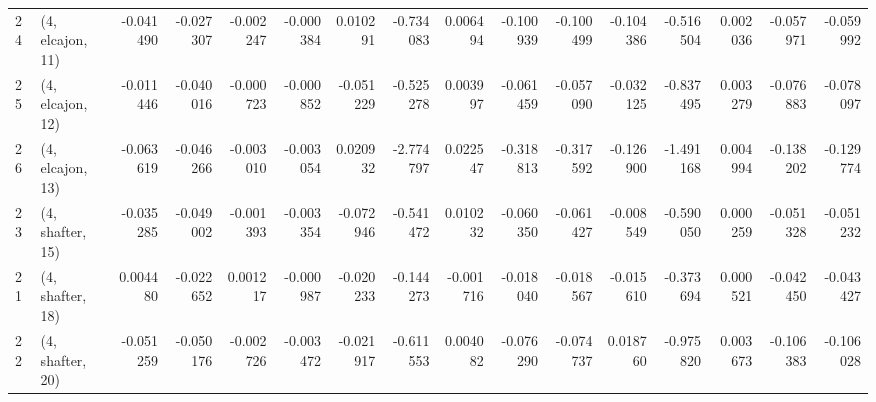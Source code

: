 \begin{tabular}{llrrrrrrrrrrrrrr}
24 &  (4, elcajon, 11) & -0.041490 & -0.027307 &  -0.002247 & -0.000384 &  0.010291 &  -0.734083 &  0.006494 &  -0.100939 & -0.100499 & -0.104386 &  -0.516504 &  0.002036 & -0.057971 & -0.059992 \\
25 &  (4, elcajon, 12) & -0.011446 & -0.040016 &  -0.000723 & -0.000852 & -0.051229 &  -0.525278 &  0.003997 &  -0.061459 & -0.057090 & -0.032125 &  -0.837495 &  0.003279 & -0.076883 & -0.078097 \\
26 &  (4, elcajon, 13) & -0.063619 & -0.046266 &  -0.003010 & -0.003054 &  0.020932 &  -2.774797 &  0.022547 &  -0.318813 & -0.317592 & -0.126900 &  -1.491168 &  0.004994 & -0.138202 & -0.129774 \\
23 &  (4, shafter, 15) & -0.035285 & -0.049002 &  -0.001393 & -0.003354 & -0.072946 &  -0.541472 &  0.010232 &  -0.060350 & -0.061427 & -0.008549 &  -0.590050 &  0.000259 & -0.051328 & -0.051232 \\
21 &  (4, shafter, 18) &  0.004480 & -0.022652 &   0.001217 & -0.000987 & -0.020233 &  -0.144273 & -0.001716 &  -0.018040 & -0.018567 & -0.015610 &  -0.373694 &  0.000521 & -0.042450 & -0.043427 \\
22 &  (4, shafter, 20) & -0.051259 & -0.050176 &  -0.002726 & -0.003472 & -0.021917 &  -0.611553 &  0.004082 &  -0.076290 & -0.074737 &  0.018760 &  -0.975820 &  0.003673 & -0.106383 & -0.106028 \\
\bottomrule
\end{tabular}
